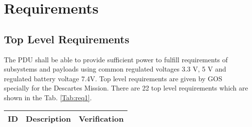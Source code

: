 \chapter{Requirements\label{cha:chapter3}}

\section{Top Level Requirements}
The PDU shall be able to provide sufficient power to fulfill requirements of subsystems and payloads using common regulated voltages 3.3 V, 5 V and regulated battery voltage 7.4V. Top level requirements are given by GOS specially for the Descartes Mission. There are 22 top level requirements which are shown in the Tab. \ref{Tab:req1}. 

\begin{longtable}{p{1cm}p{11cm}p{2cm}} \toprule
	ID & Description & Verification \\ \midrule
	

	


\end{longtable}
